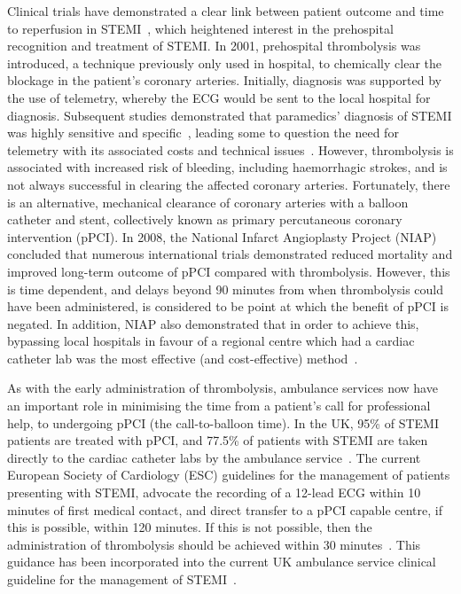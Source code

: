 Clinical trials have demonstrated a clear link between patient outcome and time to reperfusion in STEMI~\citep{department_of_health_treatment_2008}, which heightened interest in the prehospital recognition and treatment of STEMI. In 2001, prehospital thrombolysis was introduced, a technique previously only used in hospital, to chemically clear the blockage in the patient's coronary arteries. Initially, diagnosis was supported by the use of telemetry, whereby the ECG would be sent to the local hospital for diagnosis. Subsequent studies demonstrated that paramedics' diagnosis of STEMI was highly sensitive and specific~\citep{swor_prehospital_2006,feldman_real-time_2005}, leading some to question the need for telemetry with its associated costs and technical issues~\citep{woollard_limited_2005,keeling_safety_2003,johnston_paramedics_2006}. However, thrombolysis is associated with increased risk of bleeding, including haemorrhagic strokes, and is not always successful in clearing the affected coronary arteries. Fortunately, there is an alternative, mechanical clearance of coronary arteries with a balloon catheter and stent, collectively known as primary percutaneous coronary intervention (pPCI). In 2008, the National Infarct Angioplasty Project (NIAP) concluded that numerous international trials demonstrated reduced mortality and improved long-term outcome of pPCI compared with thrombolysis. However, this is time dependent, and delays beyond 90 minutes from when thrombolysis could have been administered, is considered to be point at which the benefit of pPCI is negated. In addition, NIAP also demonstrated that in order to achieve this, bypassing local hospitals in favour of a regional centre which had a cardiac catheter lab was the most effective (and cost-effective) method~\citep{department_of_health_treatment_2008}.

As with the early administration of thrombolysis, ambulance services now have an important role in minimising the time from a patient's call for professional help, to undergoing pPCI (the call-to-balloon time). In the UK, 95\% of STEMI patients are treated with pPCI, and 77.5\% of patients with STEMI are taken directly to the cardiac catheter labs by the ambulance service~\citep{ludman_national_2013}. The current European Society of Cardiology (ESC) guidelines for the management of patients presenting with STEMI, advocate the recording of a 12-lead ECG within 10 minutes of first medical contact, and direct transfer to a pPCI capable centre, if this is possible, within 120 minutes. If this is not possible, then the administration of thrombolysis should be achieved within 30 minutes~\citep{steg_esc_2012}. This guidance has been incorporated into the current UK ambulance service clinical guideline for the management of STEMI~\citep{association_of_ambulance_chief_executives_uk_2013}.

